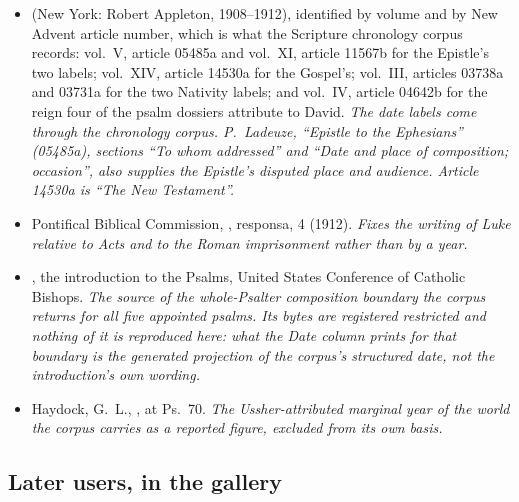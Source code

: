 \begin{itemize}[leftmargin=1.2em, itemsep=0.15em]
\item {} (New York: Robert Appleton, 1908--1912),
identified by volume and by New Advent article number, which is what the
Scripture chronology corpus records: vol.~V, article 05485a and vol.~XI, article
11567b for the Epistle's two labels; vol.~XIV, article 14530a for the Gospel's;
vol.~III, articles 03738a and 03731a for the two Nativity labels; and vol.~IV,
article 04642b for the reign four of the psalm dossiers attribute to David.
\textit{The date labels come through the chronology corpus. P.~Ladeuze,
``Epistle to the Ephesians'' (05485a), sections ``To whom addressed'' and ``Date
and place of composition; occasion'', also supplies the Epistle's disputed
place and audience. Article 14530a is ``The New Testament''.}
\item Pontifical Biblical Commission, , responsa,  4 (1912).
\textit{Fixes the writing of Luke relative to Acts and to the Roman imprisonment
rather than by a year.}
\item {}, the introduction to the Psalms,
United States Conference of Catholic Bishops. \textit{The source of the
whole-Psalter composition boundary the corpus returns for all five appointed
psalms. Its bytes are registered restricted and nothing of it is reproduced
here: what the Date column prints for that boundary is the generated projection
of the corpus's structured date, not the introduction's own wording.}
\item Haydock, G.~L., , at
Ps.~70. \textit{The Ussher-attributed marginal year of the world the corpus
carries as a reported figure, excluded from its own basis.}
\end{itemize}

\subsection*{Later users, in the gallery}

